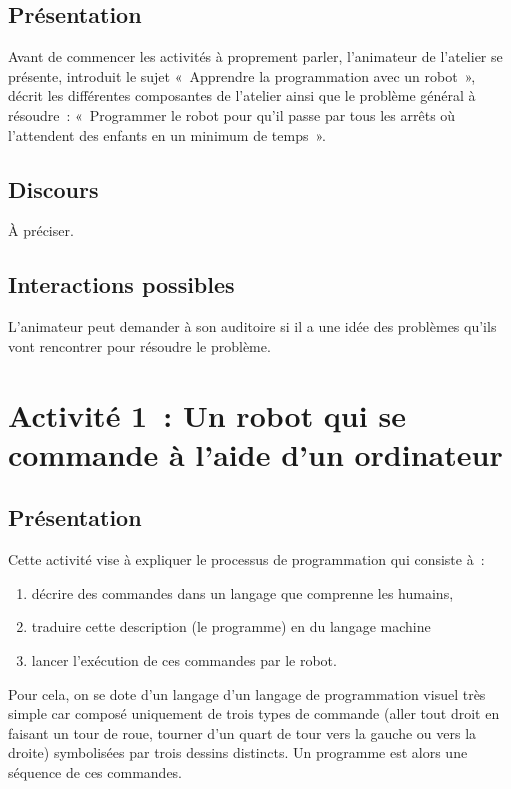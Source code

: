 \documentclass[11pt,a4paper]{article}
\begin{document}
\subsection{Présentation}

Avant de commencer les activités à proprement parler, l'animateur de l'atelier
se présente, introduit le sujet «~Apprendre la programmation avec un robot~»,
décrit les différentes composantes de l'atelier ainsi que le problème
général à résoudre~: «~Programmer le robot pour qu'il passe par tous les arrêts
où l'attendent des enfants en un minimum de temps~». 

\subsection{Discours}

À préciser. 

\subsection{Interactions possibles} L'animateur peut demander à son auditoire si il
a une idée des problèmes qu'ils vont rencontrer pour résoudre le problème. 

\section{Activité 1~: Un robot qui se commande à l'aide d'un ordinateur}
\label{sec:act1}

\subsection{Présentation}

Cette activité vise à expliquer le processus de programmation qui
consiste à~:
\begin{enumerate}
\item décrire des commandes dans un langage que comprenne les
humains, 

\item traduire cette description (le programme) en du langage machine

\item lancer l'exécution de ces commandes par le robot. 

\end{enumerate}

Pour cela, on se dote d'un langage d'un langage de programmation
visuel très simple car composé uniquement de trois types de commande
(aller tout droit en faisant un tour de roue, tourner d'un quart de
tour vers la gauche ou vers la droite) symbolisées par trois dessins
distincts. Un programme est alors une séquence de ces commandes.
\end{document}
